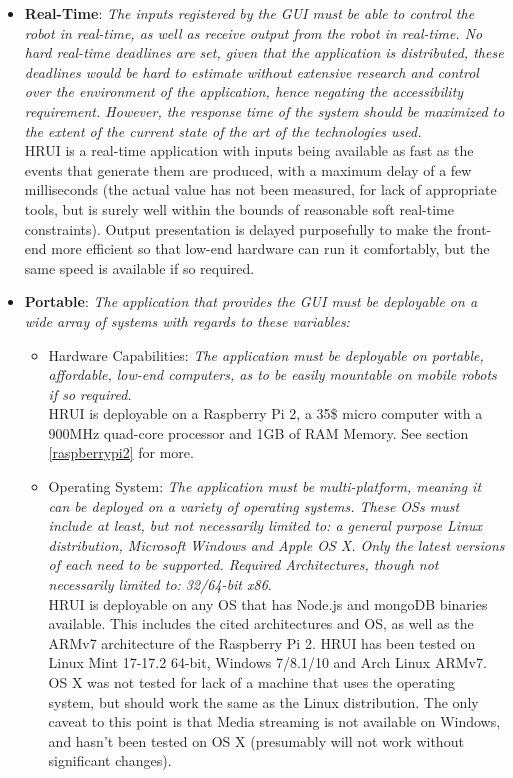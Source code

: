 \begin{itemize}
	\item \textbf{Real-Time}: \textit{The inputs registered by the GUI must be able to control the robot in real-time, as 
	well as receive output from the robot in real-time. No hard real-time deadlines are set, given that the application is 
	distributed, these deadlines would be hard to estimate without extensive research and control over the environment of 
	the application, hence negating the accessibility requirement. However, the response time of the system should be 
	maximized to the extent of the current state of the art of the technologies used.}\\

	HRUI is a real-time application with inputs being available as fast as the events that generate them are produced, with 
	a maximum delay of a few milliseconds (the actual value has not been measured, for lack of appropriate tools, but is 
	surely well within the bounds of reasonable soft real-time constraints). Output presentation is delayed purposefully to 
	make the front-end more efficient so that low-end hardware can run it comfortably, but the same speed is available if 
	so required.

	\item \textbf{Portable}: \textit{The application that provides the GUI must be deployable on a wide array of systems 
	with regards to these variables:}\\
		\begin{itemize}
			\item Hardware Capabilities: \textit{The application must be deployable on portable, affordable, low-end 
			computers, as to be easily mountable on mobile robots if so required.}\\

			HRUI is deployable on a Raspberry Pi 2, a 35\$ micro computer with a 900MHz quad-core processor and 1GB of RAM 
			Memory. See section \ref{raspberrypi2} for more.


			\item Operating System: \textit{The application must be multi-platform, meaning it can be deployed on a variety 
			of operating systems. These OSs must include at least, but not necessarily limited to: a general purpose Linux 
			distribution, Microsoft Windows and Apple OS X. Only the latest versions of each need to be supported. Required 
			Architectures, though not necessarily limited to: 32/64-bit x86}.\\

			HRUI is deployable on any OS that has Node.js and mongoDB binaries available. This includes the cited 
			architectures and OS, as well as the ARMv7 architecture of the Raspberry Pi 2. HRUI has been tested on Linux 
			Mint 17-17.2 64-bit, Windows 7/8.1/10 and Arch Linux ARMv7. OS X was not tested for lack of a machine that uses 
			the operating system, but should work the same as the Linux distribution. The only caveat to this point is that 
			Media streaming is not available on Windows, and hasn't been tested on OS X (presumably will not work without 
			significant changes).


\end{itemize}
\end{itemize}
